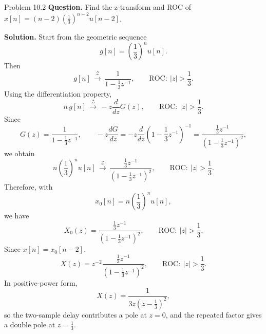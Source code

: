 \documentclass[10pt]{article}
\newcommand{\ROC}{\mathrm{ROC}}
\newcommand{\ZT}{\mathcal{Z}}
\newcommand{\Prompt}[1]{\textbf{Question.} #1}
\newcommand{\SketchLabel}{\tcblower\textbf{Solution.}}
\newcommand{\Zpair}[2]{#1\,\mathrel{\overset{\ZT}{\longrightarrow}}\,#2}
\begin{document}
\begin{examplebox}{Problem 10.2}
  \Prompt{Find the z-transform and ROC of \(x[n]=(n-2)\left(\frac13\right)^{n-2}u[n-2]\).}

  \medskip
  \SketchLabel{}
  Start from the geometric sequence
  \[
    g[n]=\left(\frac13\right)^n u[n].
  \]
  Then
  \[
    \Zpair{g[n]}{\frac{1}{1-\frac13 z^{-1}}},
    \qquad
    \ROC:\ |z|>\frac13.
  \]
  Using the differentiation property,
  \[
    \Zpair{n\,g[n]}{-z\frac{d}{dz}G(z)},
    \qquad
    \ROC:\ |z|>\frac13.
  \]
  Since
  \[
    G(z)=\frac{1}{1-\frac13 z^{-1}},
    \qquad
    -z\frac{dG}{dz}
    =-z\frac{d}{dz}\left(1-\frac13 z^{-1}\right)^{-1}
    =\frac{\frac13 z^{-1}}{\left(1-\frac13 z^{-1}\right)^2},
  \]
  we obtain
  \[
    \Zpair{n\left(\frac13\right)^n u[n]}{\frac{\frac13 z^{-1}}{\left(1-\frac13 z^{-1}\right)^2}},
    \qquad
    \ROC:\ |z|>\frac13.
  \]
  Therefore, with
  \[
    x_0[n]=n\left(\frac13\right)^n u[n],
  \]
  we have
  \[
    X_0(z)=\frac{\frac13 z^{-1}}{\left(1-\frac13 z^{-1}\right)^2},
    \qquad
    \ROC:\ |z|>\frac13.
  \]
  Since \(x[n]=x_0[n-2]\),
  \[
    X(z)=z^{-2}\frac{\frac13 z^{-1}}{\left(1-\frac13 z^{-1}\right)^2},
    \qquad
    \ROC:\ |z|>\frac13.
  \]
  In positive-power form,
  \[
    X(z)=\frac{1}{3z\left(z-\frac13\right)^2},
  \]
  so the two-sample delay contributes a pole at \(z=0\), and the repeated factor gives a double pole at \(z=\frac13\).

  \begin{center}
  \end{center}
\end{examplebox}
\end{document}
